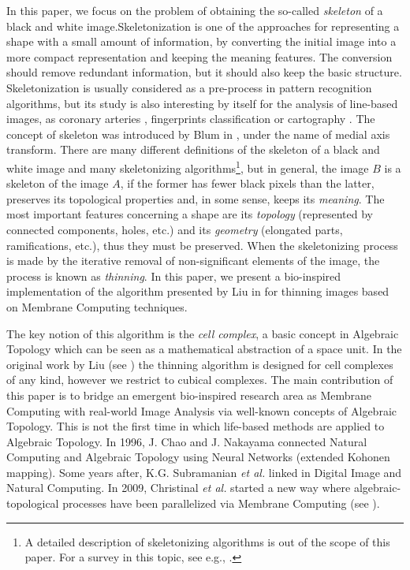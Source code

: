 \documentclass[journal]{IEEEtran}
\begin{document}
In this paper, we focus on the problem of obtaining the so-called
{\it skeleton} of a black and white image.Skeletonization is one of
the approaches for representing a shape with a small amount of
information, by converting the initial image into a more compact
representation and keeping the meaning features. The conversion
should remove redundant information, but it should also keep the
basic structure. Skeletonization is usually considered as a
pre-process in pattern recognition algorithms, but its study is also
interesting by itself for the analysis of line-based images, as
coronary arteries \cite{Dufresne1994343}, fingerprints
classification \cite{HongbinJY2007} or cartography
\cite{Lee2000165}. The concept of skeleton was introduced by Blum in
\cite{Blum62Associative_Plenumpress}, under the name of medial axis
transform. There are many different definitions of the skeleton of a
black and white image and many skeletonizing algorithms\footnote{A
detailed description of skeletonizing algorithms is out of the scope
of this paper. For a survey in this topic, see e.g.,
\cite{DBLP:journals/amcs/SaeedTRA10}.}, but in general, the image
$B$ is a skeleton of the image $A$, if the former has fewer black
pixels than the latter, preserves its topological properties and, in
some sense, keeps its \emph{meaning}. The most important features
concerning a shape are its \emph{topology} (represented by connected
components, holes, etc.) and its \emph{geometry} (elongated parts,
ramifications, etc.), thus they must be preserved. When the
skeletonizing process is made by the iterative removal of
non-significant elements of the image, the process is known as {\it
thinning}. In this paper, we present a bio-inspired implementation
of the algorithm presented by Liu in \cite{liu20093d,DBLP:journals/cgf/LiuCLJ10} for thinning
images based on Membrane Computing techniques.

The key notion of this algorithm is the {\it cell complex}, a basic
concept in Algebraic Topology which can be seen as a mathematical
abstraction of a space unit. In the original work by Liu (see \cite{liu20093d,DBLP:journals/cgf/LiuCLJ10}) 
the thinning algorithm is designed for cell complexes of any kind, however we
restrict to cubical complexes. The main contribution of this paper is
to bridge an emergent bio-inspired research area as Membrane
Computing with real-world Image Analysis via well-known concepts of
Algebraic Topology. This is not the first time in which life-based
methods are applied to Algebraic Topology. In 1996, J. Chao and J.
Nakayama connected Natural Computing and Algebraic Topology using
Neural Networks \cite{10.1109/ICPR.1996.547259} (extended Kohonen
mapping). Some years after, K.G. Subramanian {\it et al.} linked in
\cite{DBLP:journals/nc/CeterchiMPS03} Digital Image and Natural
Computing. In 2009, Christinal {\it et al.} started a new way where
algebraic-topological processes have been parallelized via Membrane
Computing (see
\cite{DBLP:conf/iwcia/ChristinalDJ09,ChristinalDR10,DiazPernilCGR2012,Diaz-PernilGRS10}).
\end{document}
